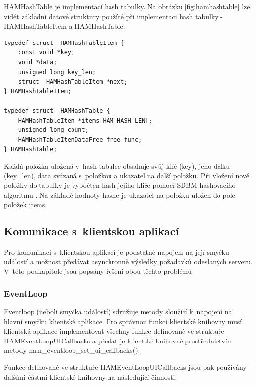 HAMHashTable je implementací hash tabulky. Na obrázku \ref{fig:hamhashtable} lze vidět základní datové struktury
použíté při implementaci hash tabulky - HAMHashTableItem a HAMHashTable:

\begin{verbatim}
typedef struct _HAMHashTableItem {
	const void *key;
	void *data;
	unsigned long key_len;
	struct _HAMHashTableItem *next;
} HAMHashTableItem;

typedef struct _HAMHashTable {
	HAMHashTableItem *items[HAM_HASH_LEN];
	unsigned long count;
	HAMHashTableItemDataFree free_func;
} HAMHashTable;
\end{verbatim}

Každá položka uložená v~hash tabulce obsahuje svůj klíč (key), jeho délku (key\_len), data svázaná s~položkou a ukazatel
na další položku. Při vložení nové položky do tabulky je vypočten hash jejího kliče pomocí SDBM
hashovacího algoritmu \cite{sdbm}. %
Na základě hodnoty hashe je ukazatel na položku uložen do pole položek items.

\subsection{Komunikace s~klientskou aplikací}
\label{implementace_knihovna_komunikace}

Pro komunikaci s~klientskou aplikací je podstatné napojení na její smyčku událostí a možnost předávat asynchronně
výsledky požadavků odeslaných serveru. V~této podkapitole jsou popsány řešení obou těchto problémů

\subsubsection{EventLoop}

Eventloop (neboli smyčka událostí) sdružuje metody sloužící k~napojení na hlavní smyčku
klientské aplikace. Pro správnou funkci klientské
knihovny musí klientská aplikace implementovat všechny funkce definované ve struktuře HAMEventLoopUICallbacks a
předat je klientské knihovně prostřednictvím metody ham\_eventloop\_set\_ui\_callbacks().

Funkce definované ve struktuře HAMEventLoopUICallbacks jsou pak používány dalšími částmi klientské knihovny na
následující činnosti:

